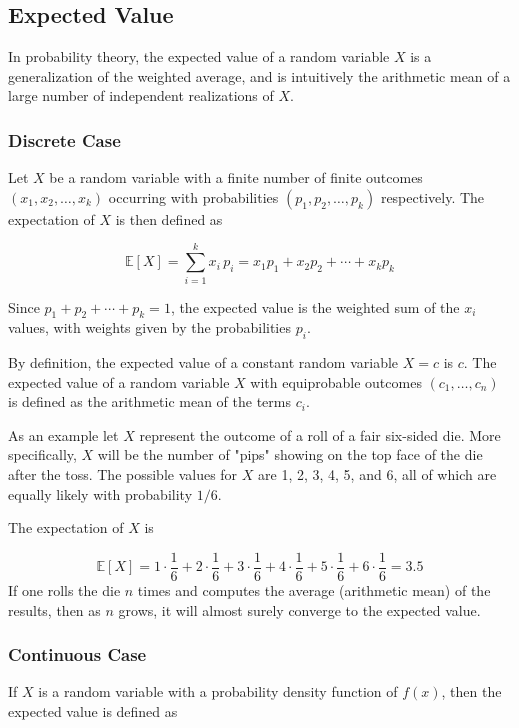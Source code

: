 \subsection{Expected Value}\label{sec:expected-value}

In probability theory, the expected value of a random variable \(X\) is a generalization of the weighted average, and is intuitively the arithmetic mean of a large number of independent realizations of \(X\).

\subsubsection{Discrete Case}
Let \(X\) be a random variable with a finite number of finite outcomes \((x_{1},x_{2},\ldots ,x_{k})\) occurring with probabilities \((p_{1},p_{2},\ldots ,p_{k})\) respectively. The expectation of \(X\) is then defined as

\begin{equation}
	\mathbb{E}[X]=\sum _{i=1}^{k}x_{i}\,p_{i}=x_{1}p_{1}+x_{2}p_{2}+\cdots +x_{k}p_{k}
\end{equation}

Since \(p_{1}+p_{2}+\cdots +p_{k}=1\), the expected value is the weighted sum of the \(x_{i}\) values, with weights given by the probabilities \(p_{i}\).

By definition, the expected value of a constant random variable \(X=c\) is \(c\). The expected value of a random variable \(X\) with equiprobable outcomes \((c_{1},\ldots ,c_{n})\) is defined as the arithmetic mean of the terms \(c_i\). 

As an example let \(X\) represent the outcome of a roll of a fair six-sided die. More specifically, \(X\) will be the number of "pips" showing on the top face of the die after the toss. The possible values for \(X\) are 1, 2, 3, 4, 5, and 6, all of which are equally likely with probability \(1/6\).

The expectation of \(X\) is

\begin{equation*}
	\mathbb{E}[X]=1\cdot {\frac {1}{6}}+2\cdot {\frac {1}{6}}+3\cdot {\frac {1}{6}}+4\cdot {\frac {1}{6}}+5\cdot {\frac {1}{6}}+6\cdot {\frac {1}{6}}=3.5
\end{equation*}
If one rolls the die \(n\) times and computes the average (arithmetic mean) of the results, then as \(n\) grows, it will almost surely converge to the expected value.

\subsubsection{Continuous Case}
If \(X\) is a random variable with a probability density function of \(f(x)\), then the expected value is defined as

